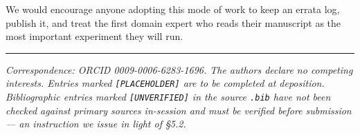 \documentclass[11pt,a4paper]{article}
\begin{document}
\vspace{0.5em}

We would encourage anyone adopting this mode of work to keep an errata log, publish it,
and treat the first domain expert who reads their manuscript as the most important
experiment they will run.

\vspace{1em}
\hrule
\vspace{0.6em}

{\small\itshape Correspondence: ORCID 0009-0006-6283-1696. The authors declare no
competing interests. Entries marked \texttt{[PLACEHOLDER]} are to be completed at
deposition. Bibliographic entries marked \texttt{[UNVERIFIED]} in the source
\texttt{.bib} have not been checked against primary sources in-session and must be
verified before submission --- an instruction we issue in light of \S5.2.}



\end{document}
